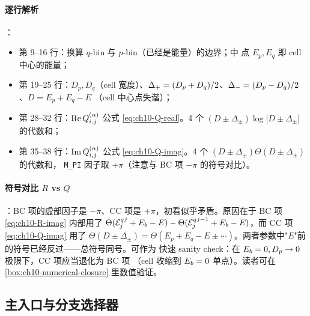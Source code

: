 

\paragraph{逐行解析}：
\begin{itemize}
  \item 第 9--16 行：换算 \(q\)-bin 与 \(p\)-bin（已经是能量）的边界；中
        点 \(E_p, E_q\) 即 cell 中心的能量；
  \item 第 19--25 行：\(D_p, D_q\)（cell 宽度）、\(\Delta_{+} =
        (D_p+D_q)/2\)、\(\Delta_{-} = (D_p-D_q)/2\)、\(D = E_p + E_q - E\)
        （cell 中心点失谐）；
  \item 第 28--32 行：\(\operatorname{Re} Q_{i,j}^{(\alpha)}\) 公式 \cref{eq:ch10-Q-real}。4 个
        \((D \pm \Delta_\pm)\log|D \pm \Delta_\pm|\) 的代数和；
  \item 第 35--38 行：\(\operatorname{Im} Q_{i,j}^{(\alpha)}\) 公式 \cref{eq:ch10-Q-imag}。4 个
        \((D \pm \Delta_\pm)\Theta(D \pm \Delta_\pm)\) 的代数和，
        \texttt{M\_PI} 因子取 \(+\pi\)（注意与 BC 项 \(-\pi\) 的符号对比）。
\end{itemize}

\paragraph{符号对比 \(R\) vs \(Q\)}：BC 项的虚部因子是 \(-\pi\)、CC 项是
\(+\pi\)，初看似乎矛盾。原因在于 BC 项 \cref{eq:ch10-R-imag} 内部用了
\(\Theta({\mathcal{E}_{j}^{q}}^j + E_b - E) - \Theta({\mathcal{E}_{j}^{q}}^{j-1} + E_b - E)\)，而 CC 项
\cref{eq:ch10-Q-imag} 用了 \(\Theta(D \pm \Delta_\pm) = \Theta(E_p + E_q - E
\pm \cdots)\)。两者参数中"\(E\)"前的符号已经反过——总符号同号。可作为
快速 sanity check：在 \(E_b=0, D_p \to 0\) 极限下，CC 项应当退化为 BC 项
（cell 收缩到 \(E_b=0\) 单点）。读者可在
\cref{box:ch10-numerical-closure} 里数值验证。

\subsection{主入口与分支选择器}
\label{subsec:ch10-main-entry}



